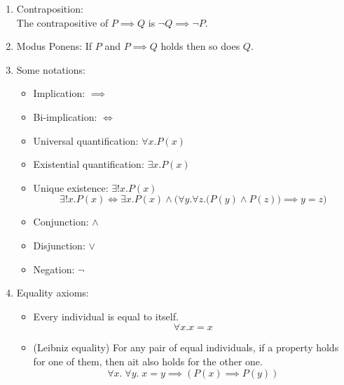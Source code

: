 \documentclass{article}
\begin{document}
\begin{enumerate}
\begin{itemize}[label={-},topsep=0pt]
        \end{itemize}
    \item Contraposition:\\
        The contrapositive of $P\implies Q$ is $\neg Q\implies\neg P$.
    \item Modus Ponens:
        If $P$ and $P\implies Q$ holds then so does $Q$.
        \begin{prooftree}
        \end{prooftree}
    \item Some notations:
        \begin{itemize}[label={-},topsep=0pt]
            \item Implication: $\implies$
            \item Bi-implication: $\Longleftrightarrow$
            \item Universal quantification: $\forall x.P(x)$
            \item Existential quantification: $\exists x.P(x)$
            \item Unique existence: $\exists!x.P(x)$
                $$\exists!x.P(x)\Longleftrightarrow\exists x.P(x)\wedge\Big(\forall y.\forall z.\big(P(y)\wedge P(z)\big)\implies y=z\Big)$$
            \item Conjunction: $\wedge$
            \item Disjunction: $\vee$
            \item Negation: $\neg$
        \end{itemize}
    \item Equality axioms:
        \begin{itemize}[label={-},topsep=0pt]
            \item Every individual is equal to itself.
                $$\forall x.x=x$$
            \item (Leibniz equality) For any pair of equal individuals, if a property holds for one of them, then ait also holds for the other one.
                $$\forall x.\;\forall y.\;x=y\implies (P(x)\implies P(y))$$
        \end{itemize}
\end{enumerate}
\end{document}
